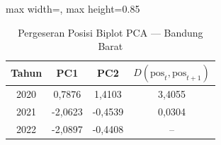 \begin{table}[H]
\centering
\caption{Pergeseran Posisi Biplot PCA --- Bandung Barat} \label{tab:samplejarak_pca_skor_bandung_barat}
\begin{adjustbox}{max width=\textwidth, max height=0.85\textheight}
\begin{tabular}{|c|c|c|c|}
\hline
\textbf{Tahun} & \textbf{PC1} & \textbf{PC2} & \textbf{$D(\text{pos}_t, \text{pos}_{t+1})$} \\
\hline
2020 & 0,7876 & 1,4103 & 3,4055 \\
2021 & -2,0623 & -0,4539 & 0,0304 \\
2022 & -2,0897 & -0,4408 & -- \\
\hline
\end{tabular}
\end{adjustbox}
\end{table}